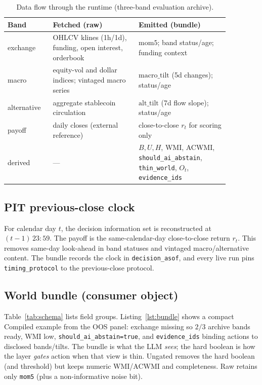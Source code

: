 \documentclass[sigconf,anonymous]{acmart}
\theoremstyle{acmdefinition}%
\theoremstyle{acmplain}%
\begin{document}
\begin{table}[t]
  \caption{Data flow through the runtime (three-band evaluation archive).}
  \label{tab:dataflow}
  \small
  \begin{tabular}{>{\raggedright\arraybackslash}p{0.17\linewidth}>{\raggedright\arraybackslash}p{0.34\linewidth}>{\raggedright\arraybackslash}p{0.36\linewidth}}
    \toprule
    Band & Fetched (raw) & Emitted (bundle) \\
    \midrule
    exchange & OHLCV klines (1h/1d), funding, open interest, orderbook & \(\mathrm{mom5}\); band status/age; funding context \\
    macro & equity-vol and dollar indices; vintaged macro series & \(\mathrm{macro\_tilt}\) (5d changes); status/age \\
    alternative & aggregate stablecoin circulation & \(\mathrm{alt\_tilt}\) (7d flow slope); status/age \\
    payoff & daily closes (external reference) & close-to-close \(r_t\) for scoring only \\
    derived & --- & \(B,U,H\), WMI, ACWMI, \texttt{should\_ai\_abstain}, \texttt{thin\_world}, \(O_t\), \texttt{evidence\_ids} \\
    \bottomrule
  \end{tabular}
\end{table}

\subsection{PIT previous-close clock}
For calendar day \(t\), the decision information set is reconstructed at \((t{-}1)\,23{:}59\). The payoff is the same-calendar-day close-to-close return \(r_t\). This removes same-day look-ahead in band statuses and vintaged macro/alternative content. The bundle records the clock in \texttt{decision\_asof}, and every live run pins \texttt{timing\_protocol} to the previous-close protocol.

\subsection{World bundle (consumer object)}
Table~\ref{tab:schema} lists field groups. Listing~\ref{lst:bundle} shows a compact Compiled example from the OOS panel: exchange missing so \(2/3\) archive bands ready, WMI low, \texttt{should\_ai\_abstain=true}, and \texttt{evidence\_ids} binding actions to disclosed bands/tilts. The bundle is what the LLM \emph{sees}; the hard boolean is how the layer \emph{gates} action when that view is thin. Ungated removes the hard boolean (and threshold) but keeps numeric WMI/ACWMI and completeness. Raw retains only \texttt{mom5} (plus a non-informative noise bit).
\end{document}
